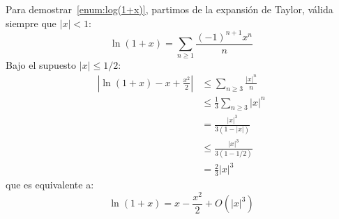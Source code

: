   Para demostrar~\ref{enum:log(1+x)},
  partimos de la expansión de Taylor,
  válida siempre que \(\lvert x \rvert < 1\):
  \begin{equation*}
    \ln(1 + x)
      = \sum_{n \ge 1} \frac{(-1)^{n + 1} x^n}{n}
  \end{equation*}
  Bajo el supuesto \(\lvert x \rvert \le 1 / 2\):
  \begin{align*}
    \left\lvert \ln (1 + x) - x + \frac{x^2}{2} \right\rvert
      &\le \sum_{n \ge 3} \frac{\lvert x \rvert^n}{n} \\
      &\le \frac{1}{3} \sum_{n \ge 3} \lvert x \rvert^n \\
      &=   \frac{\lvert x \rvert^3}{3 (1 - \lvert x \rvert)} \\
      &\le \frac{\lvert x \rvert^3}{3 (1 - 1/2)} \\
      &=   \frac{2}{3} \lvert x \rvert^3
  \end{align*}
  que es equivalente a:
  \begin{equation*}
    \ln(1 + x)
      = x - \frac{x^2}{2} + O(\lvert x \rvert^3)
  \end{equation*}

